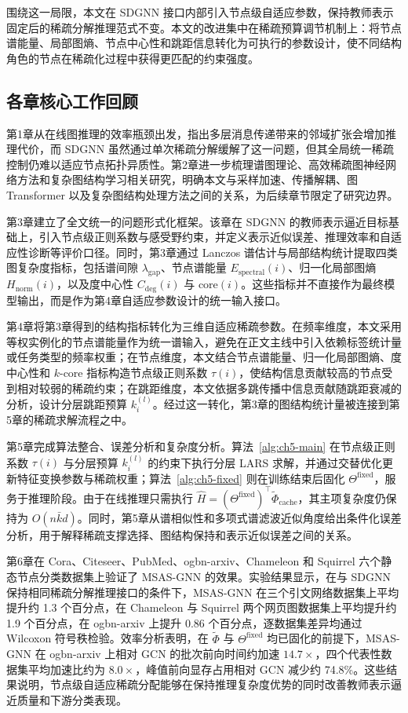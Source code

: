 围绕这一局限，本文在 SDGNN 接口内部引入节点级自适应参数，保持教师表示固定后的稀疏分解推理范式不变。本文的改进集中在稀疏预算调节机制上：将节点谱能量、局部图熵、节点中心性和跳距信息转化为可执行的参数设计，使不同结构角色的节点在稀疏化过程中获得更匹配的约束强度。

\subsection{各章核心工作回顾}\label{subsec:ch7-chapters}

第1章从在线图推理的效率瓶颈出发，指出多层消息传递带来的邻域扩张会增加推理代价，而 SDGNN 虽然通过单次稀疏分解缓解了这一问题，但其全局统一稀疏控制仍难以适应节点拓扑异质性。第2章进一步梳理谱图理论、高效稀疏图神经网络方法和复杂图结构学习相关研究，明确本文与采样加速、传播解耦、图 Transformer 以及复杂图结构处理方法之间的关系，为后续章节限定了研究边界。

第3章建立了全文统一的问题形式化框架。该章在 SDGNN 的教师表示逼近目标基础上，引入节点级正则系数与感受野约束，并定义表示近似误差、推理效率和自适应性诊断等评价口径。同时，第3章通过 Lanczos 谱估计与局部结构统计提取四类图复杂度指标，包括谱间隙 $\lambda_{\text{gap}}$、节点谱能量 $E_{\text{spectral}}(i)$、归一化局部图熵 $H_{\text{norm}}(i)$，以及度中心性 $C_{\text{deg}}(i)$ 与 $\text{core}(i)$。这些指标并不直接作为最终模型输出，而是作为第4章自适应参数设计的统一输入接口。

第4章将第3章得到的结构指标转化为三维自适应稀疏参数。在频率维度，本文采用等权实例化的节点谱能量作为统一谱输入，避免在正文主线中引入依赖标签统计量或任务类型的频率权重；在节点维度，本文结合节点谱能量、归一化局部图熵、度中心性和 $k$-core 指标构造节点级正则系数 $\tau(i)$，使结构信息贡献较高的节点受到相对较弱的稀疏约束；在跳距维度，本文依据多跳传播中信息贡献随跳距衰减的分析，设计分层跳距预算 $k_i^{(l)}$。经过这一转化，第3章的图结构统计量被连接到第5章的稀疏求解流程之中。

第5章完成算法整合、误差分析和复杂度分析。算法~\ref{alg:ch5-main} 在节点级正则系数 $\tau(i)$ 与分层预算 $k_i^{(l)}$ 的约束下执行分层 LARS 求解，并通过交替优化更新特征变换参数与稀疏权重；算法~\ref{alg:ch5-fixed} 则在训练结束后固化 $\Theta^{\mathrm{fixed}}$，服务于推理阶段。由于在线推理只需执行 $\hat{H}=(\Theta^{\mathrm{fixed}})^\top\tilde{\Phi}_{\mathrm{cache}}$，其主项复杂度仍保持为 $O(n\bar{k}d)$。同时，第5章从谱相似性和多项式谱滤波近似角度给出条件化误差分析，用于解释稀疏支撑选择、图结构保持和表示近似误差之间的关系。

第6章在 Cora、Citeseer、PubMed、ogbn-arxiv、Chameleon 和 Squirrel 六个静态节点分类数据集上验证了 MSAS-GNN 的效果。实验结果显示，在与 SDGNN 保持相同稀疏分解推理接口的条件下，MSAS-GNN 在三个引文网络数据集上平均提升约 1.3 个百分点，在 Chameleon 与 Squirrel 两个网页图数据集上平均提升约 1.9 个百分点，在 ogbn-arxiv 上提升 0.86 个百分点，逐数据集差异均通过 Wilcoxon 符号秩检验。效率分析表明，在 $\tilde{\Phi}$ 与 $\Theta^{\mathrm{fixed}}$ 均已固化的前提下，MSAS-GNN 在 ogbn-arxiv 上相对 GCN 的批次前向时间约加速 $14.7\times$，四个代表性数据集平均加速比约为 $8.0\times$，峰值前向显存占用相对 GCN 减少约 74.8\%。这些结果说明，节点级自适应稀疏分配能够在保持推理复杂度优势的同时改善教师表示逼近质量和下游分类表现。

